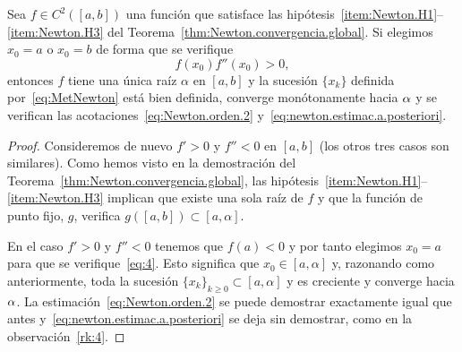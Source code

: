 \begin{corollary}
  Sea $f \in C^2([a,b])$ una función que satisface las
  hipótesis~\ref{item:Newton.H1}--\ref{item:Newton.H3} del
  Teorema~\ref{thm:Newton.convergencia.global}. Si elegimos $x_0=a$
  o $x_0=b$ de forma que se verifique
  \begin{equation}
    \label{eq:4}
    f(x_0) f''(x_0) > 0,
  \end{equation}
  entonces $f$ tiene una única raíz $\alpha$ en $[a,b]$ y la
  sucesión $\{x_k\}$ definida por~\eqref{eq:MetNewton} está bien
  definida, converge monótonamente hacia $\alpha$ y se verifican las
  acotaciones~\eqref{eq:Newton.orden.2}
  y~\eqref{eq:newton.estimac.a.posteriori}.
  \label{cor:regla.fourier}    
  \end{corollary}
  \begin{proof}
    Consideremos de nuevo $f'>0$ y $f''<0$ en $[a,b]$ (los otros tres
    casos son similares).  Como hemos visto en la demostración del
    Teorema~\ref{thm:Newton.convergencia.global}, las
    hipótesis~\ref{item:Newton.H1}--\ref{item:Newton.H3} implican que
    existe una sola raíz de $f$ y que la función de punto fijo, $g$,
    verifica $g([a,b])\subset [a,\alpha]$.
    
    En el caso $f'>0$ y $f''<0$ tenemos que $f(a)<0$ y por tanto
    elegimos $x_0=a$ para que se verifique~\eqref{eq:4}. Esto
    significa que $x_0\in [a,\alpha]$ y, razonando como anteriormente, toda
    la sucesión $\{x_k\}_{k\ge 0} \subset[a,\alpha]$ y es creciente y
    converge hacia $\alpha$. La
    estimación~\eqref{eq:Newton.orden.2} se puede demostrar
    exactamente igual que antes
    y~\eqref{eq:newton.estimac.a.posteriori} se deja sin demostrar,
    como en la observación~\ref{rk:4}.
  \end{proof}
  
